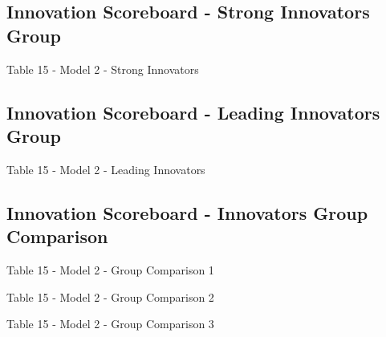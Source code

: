 \documentclass{beamer}					%
\begin{document}
	\subsection{Innovation Scoreboard - Strong Innovators Group}

	\begin{frame}{Table 15 - Model 2 - Strong Innovators}
		
	\end{frame}

	\subsection{Innovation Scoreboard - Leading Innovators Group}

	\begin{frame}{Table 15 - Model 2 - Leading Innovators}
		
	\end{frame}
	
	\subsection{Innovation Scoreboard - Innovators Group Comparison}	

	\begin{frame}{Table 15 - Model 2 - Group Comparison 1}
		
	\end{frame}

	\begin{frame}{Table 15 - Model 2 - Group Comparison 2}
		
	\end{frame}

	\begin{frame}{Table 15 - Model 2 - Group Comparison 3}
		
	\end{frame}


%	


%			
%	
	
%		
	
\end{document}
